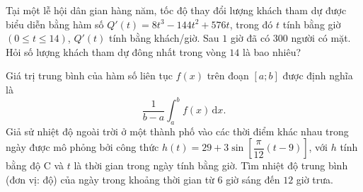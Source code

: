 \begin{ex}%
	Tại một lễ hội dân gian hàng năm, tốc độ thay đổi lượng khách tham dự được biểu diễn bằng hàm số $Q'(t)=8t^3-144t^2+576t$, trong đó $t$ tính bằng giờ $(0\leq t \leq 14)$, $Q'(t)$ tính bằng khách/giờ. Sau $1$ giờ đã có $300$ người có mặt. Hỏi số lượng khách tham dự đông nhất trong vòng $14$ là bao nhiêu?
\end{ex}

\begin{ex}%
	Giá trị trung bình của hàm số liên tục $f(x)$ trên đoạn $[a ; b]$ được định nghĩa là
	$$
	\dfrac{1}{b-a} \int_a^b f(x) \mathrm{\,d}x .
	$$
	Giả sử nhiệt độ ngoài trời ở một thành phố vào các thời điểm khác nhau trong ngày được mô phỏng bởi công thức $	h(t)=29+3 \sin \left[\dfrac{\pi}{12}(t-9)\right]$, với $h$ tính bằng độ $\mathrm{C}$ và $t$ là thời gian trong ngày tính bằng giờ.	Tìm nhiệt độ trung bình (đơn vị: độ) của ngày trong khoảng thời gian từ $6$ giờ sáng đến $12$ giờ trưa.
\end{ex}

